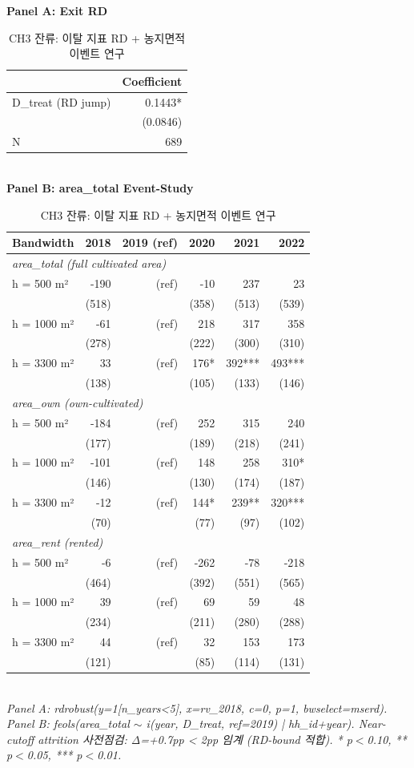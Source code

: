 \begin{table}[t]
\centering
\caption{CH3 잔류: 이탈 지표 RD + 농지면적 이벤트 연구}
\label{tab:ch3_retention_ko}
\textbf{Panel A: Exit RD}\\
\begin{tabular}{lr}
\toprule
 & Coefficient \\
\midrule
D\_treat (RD jump) & 0.1443* \\
 & (0.0846) \\
N          & 689 \\
\bottomrule
\end{tabular}\\[1ex]
\textbf{Panel B: area\_total Event-Study}\\
\begin{tabular}{lrrrrr}
\toprule
Bandwidth & 2018 & 2019 (ref) & 2020 & 2021 & 2022 \\
\midrule
\multicolumn{6}{l}{\textit{area\_total (full cultivated area)}} \\
\midrule
h = 500 m² & -190 & (ref) & -10 & 237 & 23 \\
       & (518) &  & (358) & (513) & (539) \\
h = 1000 m² & -61 & (ref) & 218 & 317 & 358 \\
       & (278) &  & (222) & (300) & (310) \\
h = 3300 m² & 33 & (ref) & 176* & 392*** & 493*** \\
       & (138) &  & (105) & (133) & (146) \\
\midrule
\multicolumn{6}{l}{\textit{area\_own (own-cultivated)}} \\
\midrule
h = 500 m² & -184 & (ref) & 252 & 315 & 240 \\
       & (177) &  & (189) & (218) & (241) \\
h = 1000 m² & -101 & (ref) & 148 & 258 & 310* \\
       & (146) &  & (130) & (174) & (187) \\
h = 3300 m² & -12 & (ref) & 144* & 239** & 320*** \\
       & (70) &  & (77) & (97) & (102) \\
\midrule
\multicolumn{6}{l}{\textit{area\_rent (rented)}} \\
\midrule
h = 500 m² & -6 & (ref) & -262 & -78 & -218 \\
       & (464) &  & (392) & (551) & (565) \\
h = 1000 m² & 39 & (ref) & 69 & 59 & 48 \\
       & (234) &  & (211) & (280) & (288) \\
h = 3300 m² & 44 & (ref) & 32 & 153 & 173 \\
       & (121) &  & (85) & (114) & (131) \\
\bottomrule
\end{tabular}\\
\footnotesize\textit{Panel A: rdrobust(y=1[n\_years<5], x=rv\_2018, c=0, p=1, bwselect=mserd). Panel B: feols(area\_total $\sim$ i(year, D\_treat, ref=2019) | hh\_id+year). Near-cutoff attrition 사전점검: Δ=+0.7pp < 2pp 임계 (RD-bound 적합). * p$<$0.10, ** p$<$0.05, *** p$<$0.01.}
\end{table}

